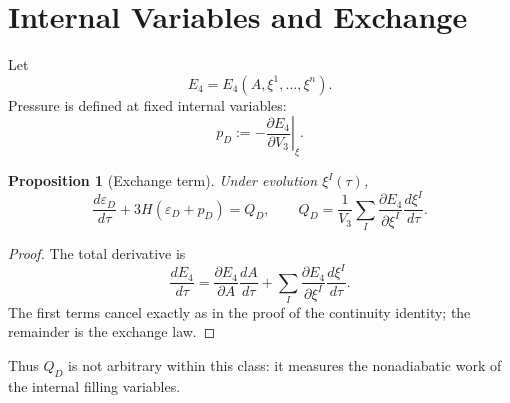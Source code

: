 \documentclass[11pt,a4paper]{article}
\def\dd{d}%
\numberwithin{equation}{section}
\theoremstyle{definition}
\theoremstyle{plain}
\newtheorem{proposition}[criterion]{Proposition}
\theoremstyle{remark}
\newcommand{\Efour}{E_4}
\newcommand{\epsD}{\varepsilon_D}
\newcommand{\pD}{p_D}
\newcommand{\QD}{Q_D}
\newcommand{\dd}{\mathrm{d}}
\begin{document}
\section{Internal Variables and Exchange}
Let
\begin{equation}
\Efour=\Efour(A,\xi^1,\ldots,\xi^n).
\end{equation}
Pressure is defined at fixed internal variables:
\begin{equation}
\pD:=-\left.\frac{\partial \Efour}{\partial V_3}\right|_{\xi}.
\end{equation}

\begin{proposition}[Exchange term]
Under evolution \(\xi^I(\tau)\),
\begin{equation}
\frac{\dd\epsD}{\dd\tau}+3H(\epsD+\pD)=\QD,
\qquad
\QD=\frac{1}{V_3}\sum_I\frac{\partial\Efour}{\partial\xi^I}\frac{\dd\xi^I}{\dd\tau}.
\end{equation}
\end{proposition}
\begin{proof}
The total derivative is
\begin{equation}
\frac{\dd\Efour}{\dd\tau}
=\frac{\partial\Efour}{\partial A}\frac{\dd A}{\dd\tau}
+\sum_I\frac{\partial\Efour}{\partial\xi^I}\frac{\dd\xi^I}{\dd\tau}.
\end{equation}
The first terms cancel exactly as in the proof of the continuity identity; the remainder is the exchange law.
\end{proof}

Thus \(\QD\) is not arbitrary within this class: it measures the nonadiabatic work of the internal filling variables.
\end{document}
